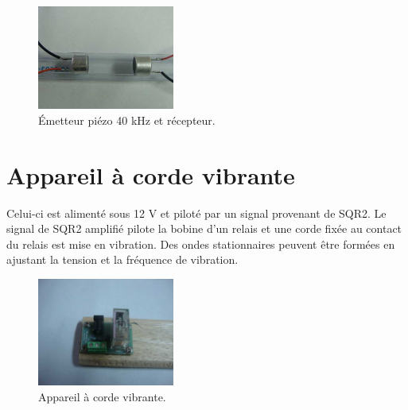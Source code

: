 \documentclass{book}
\begin{document}
\begin{figure}[h!]
\begin{center}
\caption{\label{fig:Light-Barrier-and2}Émetteur piézo 40 kHz et récepteur. }\vspace{0.5em}
\includegraphics[width=0.4\textwidth, height=0.3\textwidth, keepaspectratio]{Pic-40kHz-piezo-photo.png}
\end{center}
\end{figure}







\section{Appareil à corde vibrante}





Celui-ci est alimenté sous 12 V et piloté par un signal provenant de SQR2. Le signal de SQR2 amplifié pilote la bobine d'un relais et une corde fixée au contact du relais est mise en vibration. Des ondes stationnaires peuvent être formées en ajustant la tension et la fréquence de vibration.



\begin{figure}[h!]
\begin{center}
\caption{\label{fig:Light-Barrier-and3}Appareil à corde vibrante. }\vspace{0.5em}
\includegraphics[width=0.4\textwidth, height=0.3\textwidth, keepaspectratio]{Pic-standing-wave-app-photo.png}
\end{center}
\end{figure}






\end{document}
